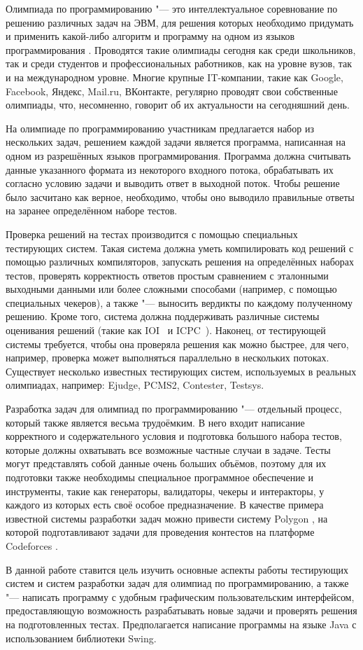 Олимпиада по программированию "--- это интеллектуальное соревнование по решению различных задач на ЭВМ, для решения которых необходимо придумать и применить какой-либо алгоритм и программу на одном из языков программирования \cite{wiki}. Проводятся такие олимпиады сегодня как среди школьников, так и среди студентов и профессиональных работников, как на уровне вузов, так и на международном уровне. Многие крупные IT-компании, такие как Google, Facebook, Яндекс, Mail.ru, ВКонтакте, регулярно проводят свои собственные олимпиады, что, несомненно, говорит об их актуальности на сегодняшний день.

На олимпиаде по программированию участникам предлагается набор из нескольких задач, решением каждой задачи является программа, написанная на одном из разрешённых языков программирования. Программа должна считывать данные указанного формата из некоторого входного потока, обрабатывать их согласно условию задачи и выводить ответ в выходной поток. Чтобы решение было засчитано как верное, необходимо, чтобы оно выводило правильные ответы на заранее определённом наборе тестов.

Проверка решений на тестах производится с помощью специальных тестирующих систем. Такая система должна уметь компилировать код решений с помощью различных компиляторов, запускать решения на определённых наборах тестов, проверять корректность ответов простым сравнением с эталонными выходными данными или более сложными способами (например, с помощью специальных чекеров), а также "--- выносить вердикты по каждому полученному решению. Кроме того, система должна поддерживать различные системы оценивания решений (такие как IOI~\cite{ioi} и ICPC~\cite{icpc}). Наконец, от тестирующей системы требуется, чтобы она проверяла решения как можно быстрее, для чего, например, проверка может выполняться параллельно в нескольких потоках. Существует несколько известных тестирующих систем, используемых в реальных олимпиадах, например: Ejudge, PCMS2, Contester, Testsys.

Разработка задач для олимпиад по программированию "--- отдельный процесс, который также является весьма трудоёмким. В него входит написание корректного и содержательного условия и подготовка большого набора тестов, которые должны охватывать все возможные частные случаи в задаче. Тесты могут представлять собой данные очень больших объёмов, поэтому для их подготовки также необходимы специальное программное обеспечение и инструменты, такие как генераторы, валидаторы, чекеры и интеракторы, у каждого из которых есть своё особое предназначение. В качестве примера известной системы разработки задач можно привести систему Polygon \cite{polygon}, на которой подготавливают задачи для проведения контестов на платформе Codeforces \cite{codeforces}.

В данной работе ставится цель изучить основные аспекты работы тестирующих систем и систем разработки задач для олимпиад по программированию, а также "--- написать программу с удобным графическим пользовательским интерфейсом, предоставляющую возможность разрабатывать новые задачи и проверять решения на подготовленных тестах. Предполагается написание программы на языке Java с использованием библиотеки Swing.